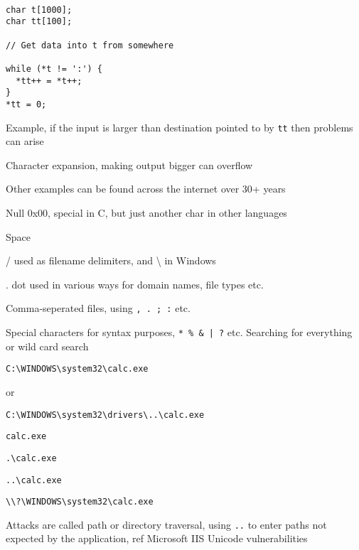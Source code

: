 \documentclass[Screen16to9,17pt]{foils}
\begin{document}


\begin{verbatim}

char t[1000];
char tt[100];

// Get data into t from somewhere

while (*t != ':') {
  *tt++ = *t++;
}
*tt = 0;
\end{verbatim}

\begin{list2}
\item Example, if the input is larger than destination pointed to by \verb+tt+ then problems can arise
\item Character expansion, making output bigger can overflow
\item Other examples can be found across the internet over 30+ years
\end{list2}


\begin{list2}
\item Null 0x00, special in C, but just another char in other languages
\item Space
\item / used as filename delimiters, and \textbackslash{} in Windows
\item . dot used in various ways for domain names, file types etc.
\item Comma-seperated files, using \verb+, . ; :+ etc.
\item Special characters for syntax purposes, \verb+* % & | ?+ etc. Searching for everything or wild card search
\end{list2}




\verb+C:\WINDOWS\system32\calc.exe+

or
\begin{list2}
\item \verb+C:\WINDOWS\system32\drivers\..\calc.exe+
\item \verb+calc.exe+
\item \verb+.\calc.exe+
\item \verb+..\calc.exe+
\item \verb+\\?\WINDOWS\system32\calc.exe+
\item Attacks are called path or directory traversal, using \verb+..+ to enter paths not expected by the application, ref Microsoft IIS Unicode vulnerabilities
\end{list2}
\end{document}
